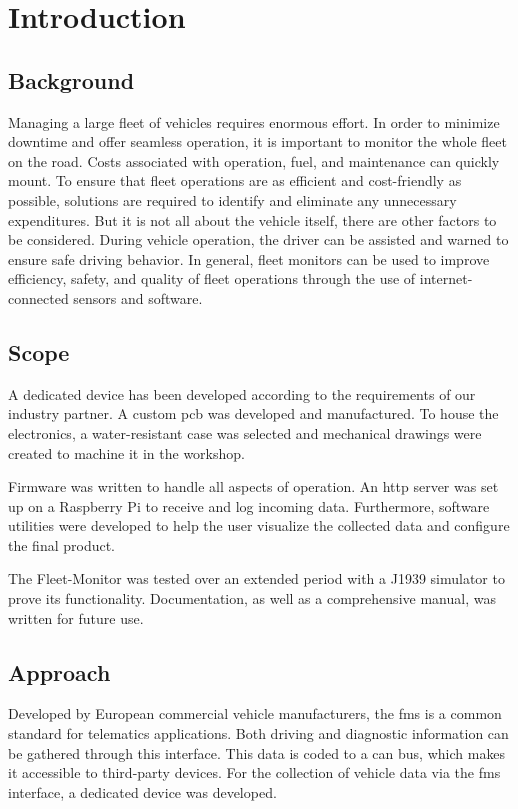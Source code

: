 \newcommand{\package}{\emph}

\chapter{Introduction}
\section{Background}
Managing a large fleet of vehicles requires enormous effort. In order to minimize downtime and offer seamless operation, it is important to monitor the whole fleet on the road. Costs associated with operation, fuel, and maintenance can quickly mount. To ensure that fleet operations are as efficient and cost-friendly as possible, solutions are required to identify and eliminate any unnecessary expenditures. But it is not all about the vehicle itself, there are other factors to be considered. During vehicle operation, the driver can be assisted and warned to ensure safe driving behavior. In general, fleet monitors can be used to improve efficiency, safety, and quality of fleet operations through the use of internet-connected sensors and software.

\section{Scope}
A dedicated device has been developed according to the requirements of our industry partner. A custom \acrshort{pcb} was developed and manufactured. To house the electronics, a water-resistant case was selected and mechanical drawings were created to machine it in the workshop. 

Firmware was written to handle all aspects of operation. An \acrshort{http} server was set up on a Raspberry Pi to receive and log incoming data. Furthermore, software utilities were developed to help the user visualize the collected data and configure the final product. 

The Fleet-Monitor was tested over an extended period with a J1939 simulator to prove its functionality. Documentation, as well as a comprehensive manual, was written for future use.

\newpage
\section{Approach}
Developed by European commercial vehicle manufacturers, the \acrfull{fms} is a common standard for telematics applications. Both driving and diagnostic information can be gathered through this interface. This data is coded to a \acrshort{can} bus, which makes it accessible to third-party devices. For the collection of vehicle data via the \acrshort{fms} interface, a dedicated device was developed.

